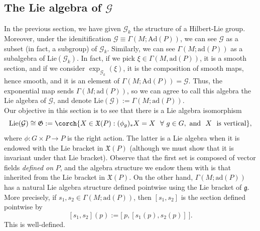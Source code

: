 \subsection{The Lie algebra of \(\mathcal{G}\)}
{\color{red}In the previous section, we have given \(\mathscr{G}_k\) the structure of a Hilbert-Lie group. Moreover, under the idenitification \(\mathcal{G} \equiv \Gamma(M; \mathrm{Ad}(P))\), we can see \(\mathcal{G}\) as a subset (in fact, a subgroup) of \(\mathscr{G}_k\). Similarly, we can see \(\Gamma(M; \mathrm{ad}(P))\) as a subalgebra of \(\mathrm{Lie}(\mathscr{G}_k)\). In fact, if we pick \(\xi \in \Gamma(M, \mathrm{ad}(P))\), it is a smooth section, and if we consider \(\exp_{\mathscr{G}_k}(\xi)\), it is the composition of smooth maps, hence smooth, and it is an element of \(\Gamma(M; \mathrm{Ad}(P))=\mathcal{G}\). Thus, the exponential map sends \(\Gamma(M; \mathrm{ad}(P))\), so we can agree to call this algebra the Lie algebra of \(\mathcal{G}\), and denote \(\mathrm{Lie}(\mathcal{G}):=\Gamma(M; \mathrm{ad}(P))\).} \\

Our objective in this section is to see that there is a Lie algebra isomorphism
\[
\mathrm{Lie}(\mathcal{G})\cong \mathfrak{G}:=\corch{X \in \mathfrak{X}(P): (\phi_g)_*X=X \ \ \forall \ g \in G, \  \text{and} \ \ X \  \text{ is vertical}  },
\]
where \(\phi\colon G \times P \to P\) is the right action. The latter is a Lie algebra when it is endowed with the Lie bracket in \(\mathfrak{X}(P)\) (although we must show that it is invariant under that Lie bracket). Observe that the first set is composed of vector fields \textit{defined on} \(P\), and the algebra structure we endow them with is that inherited from the Lie bracket in \(\mathfrak{X}(P)\). On the other hand, \(\Gamma(M; \mathrm{ad}(P))\) has a natural Lie algebra structure defined pointwise using the Lie bracket of \(\mathfrak{g}\). More precisely, if \(s_1, s_2 \in \Gamma(M; \mathrm{ad}(P))\), then \([s_1, s_2]\) is the section defined pointwise by
\[
[s_1, s_2](p):=\big[\ p, [s_1(p), s_2(p) ] \ \big].
\]
This is well-defined. 

